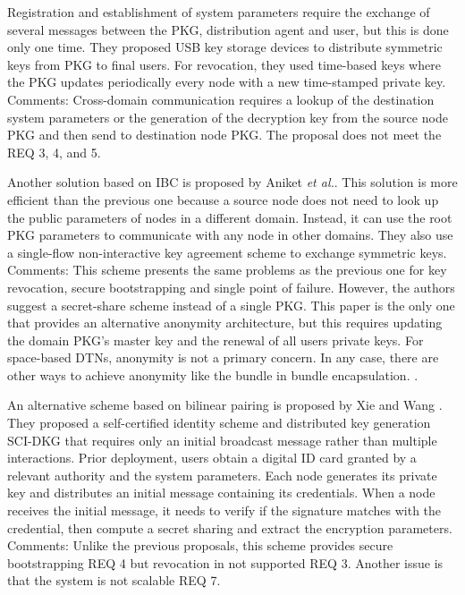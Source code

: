 Registration and establishment of system parameters require the exchange of several messages between the PKG, distribution agent and user, but this is done only one time. They proposed USB key storage devices to distribute symmetric keys from PKG to final users. For revocation, they used time-based keys where the PKG updates periodically every node with a new time-stamped private key. 
Comments: Cross-domain communication requires a lookup of the destination system parameters or the generation of the decryption key from the source node PKG and then send to destination node PKG. The proposal does not meet the REQ 3, 4, and 5.

Another solution based on IBC is proposed by Aniket \textit{et al.}\cite{kate2007anonymity}. This solution is more efficient than the previous one because a source node does not need to look up the public parameters of nodes in a different domain. Instead, it can use the root PKG parameters to communicate with any node in other domains. They also use a single-flow non-interactive key agreement scheme to exchange symmetric keys.  
Comments: This scheme presents the same problems as the previous one for key revocation, secure bootstrapping and single point of failure. However, the authors suggest a secret-share scheme instead of a single PKG. This paper is the only one that provides an alternative anonymity architecture, but this requires updating the domain PKG's master key and the renewal of all users private keys.  For space-based DTNs, anonymity is not a primary concern. In any case, there are other ways to achieve anonymity like the bundle in bundle encapsulation. \cite{ietf-dtn-bibect-00}.



An alternative scheme based on bilinear pairing is proposed by Xie and Wang \cite{xie2013practical}. They proposed a self-certified identity scheme and distributed key generation SCI-DKG that requires only an initial broadcast message rather than multiple interactions. Prior deployment, users obtain a digital ID card granted by a relevant authority and the system parameters. Each node generates its private key and distributes an initial message containing its credentials. When a node receives the initial message, it needs to verify if the signature matches with the credential, then compute a secret sharing and extract the encryption parameters. Comments: Unlike the previous proposals, this scheme provides secure bootstrapping REQ 4 but revocation in not supported REQ 3. Another issue is that the system is not scalable REQ 7.

